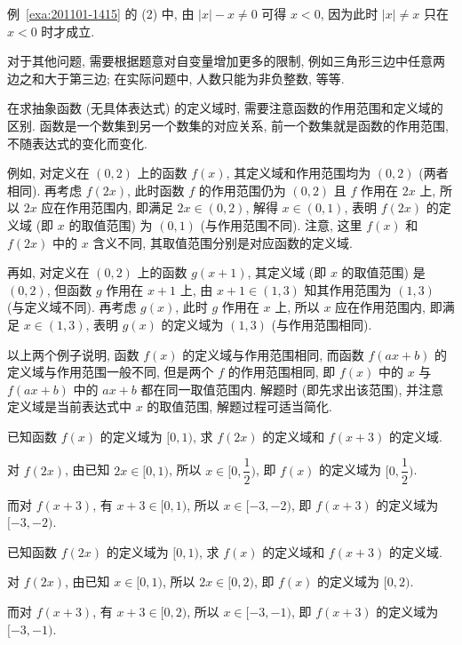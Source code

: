 例~\ref{exa:201101-1415} 的 (2) 中, 由 $|x|-x\neq 0$ 可得 $x<0$, 因为此时 $|x|\neq x$ 只在 $x<0$ 时才成立.

对于其他问题, 需要根据题意对自变量增加更多的限制, 例如三角形三边中任意两边之和大于第三边; 在实际问题中, 人数只能为非负整数, 等等.

在求抽象函数 (无具体表达式) 的定义域时, 需要注意函数的作用范围和定义域的区别. 函数是一个数集到另一个数集的对应关系, 前一个数集就是函数的作用范围, 不随表达式的变化而变化. 

例如, 对定义在 $(0,2)$ 上的函数 $f(x)$, 其定义域和作用范围均为 $(0,2)$ (两者相同). 再考虑 $f(2x)$, 此时函数 $f$ 的作用范围仍为 $(0,2)$ 且 $f$ 作用在 $2x$ 上, 所以 $2x$ 应在作用范围内, 即满足 $2x\in(0,2)$, 解得 $x\in(0,1)$, 表明 $f(2x)$ 的定义域 (即 $x$ 的取值范围) 为 $(0,1)$ (与作用范围不同). 注意, 这里 $f(x)$ 和 $f(2x)$ 中的 $x$ 含义不同, 其取值范围分别是对应函数的定义域.

再如, 对定义在 $(0,2)$ 上的函数 $g(x+1)$, 其定义域 (即 $x$ 的取值范围) 是 $(0,2)$, 但函数 $g$ 作用在 $x+1$ 上, 由 $x+1\in(1,3)$ 知其作用范围为 $(1,3)$ (与定义域不同). 再考虑 $g(x)$, 此时 $g$ 作用在 $x$ 上, 所以 $x$ 应在作用范围内, 即满足 $x\in(1,3)$, 表明 $g(x)$ 的定义域为 $(1,3)$ (与作用范围相同).

以上两个例子说明, 函数 $f(x)$ 的定义域与作用范围相同, 而函数 $f(ax+b)$ 的定义域与作用范围一般不同, 但是两个 $f$ 的作用范围相同, 即 $f(x)$ 中的 $x$ 与 $f(ax+b)$ 中的 $ax+b$ 都在同一取值范围内. 解题时 (即先求出该范围), 并注意定义域是当前表达式中 $x$ 的取值范围, 解题过程可适当简化.

\begin{example}
    已知函数 $f(x)$ 的定义域为 $[0,1)$, 求 $f(2x)$ 的定义域和 $f(x+3)$ 的定义域.
\end{example}
\begin{solution}
    对 $f(2x)$, 由已知 $2x\in[0,1)$, 所以 $x\in\biggl[0,\dfrac12\biggr)$, 即 $f(x)$ 的定义域为 $\biggl[0,\dfrac12\biggr)$.
    
    而对 $f(x+3)$, 有 $x+3\in[0,1)$, 所以 $x\in[-3,-2)$, 即 $f(x+3)$ 的定义域为 $[-3,-2)$.
\end{solution}

\begin{example}
    已知函数 $f(2x)$ 的定义域为 $[0,1)$, 求 $f(x)$ 的定义域和 $f(x+3)$ 的定义域.
\end{example}
\begin{solution}
    对 $f(2x)$, 由已知 $x\in[0,1)$, 所以 $2x\in[0,2)$, 即 $f(x)$ 的定义域为 $[0,2)$.
    
    而对 $f(x+3)$, 有 $x+3\in[0,2)$, 所以 $x\in[-3,-1)$, 即 $f(x+3)$ 的定义域为 $[-3,-1)$.
\end{solution}

